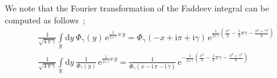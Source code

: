 \documentclass[12pt,reqno]{amsart}
\numberwithin{equation}{section}
\newcommand{\I}{\mathrm{i}}
\newcommand{\E}{\mathrm{e}}
\begin{document}
We note that
the Fourier transformation of the Faddeev integral can be computed as
follows~\cite{SLWoron00a,FaddKashVolk00a,BytskTesch02a,KharLebeSeme01a};
\begin{gather}
  \label{Fourier_transform_1}
  \frac{1}{\sqrt{4 \, \pi \, \gamma}}
  \int\limits_{\mathbb{R}}
  \mathrm{d} y \ \Phi_\gamma(y) \,
  \E^{\frac{1}{2 \, \I \, \gamma} \, x \, y}
  =
  \Phi_\gamma(-x + \I \pi + \I \gamma)
  \,
  \E^{
    \frac{1}{2 \, \I \, \gamma}
    \left(
      \frac{x^2}{2}
      - \frac{1}{2} \pi \gamma
      -
      \frac{\pi^2 + \gamma^2}{6}
    \right)
  } 
  \\[2mm]
% 
  \label{Fourier_transform_2}
  \frac{1}{\sqrt{4 \, \pi \, \gamma}}
  \int\limits_{\mathbb{R}} \mathrm{d} y \
  \frac{1}{\Phi_\gamma(y)} \,
  \E^{
    \frac{1}{2 \, \I \, \gamma} x \, y
  }
  =
  \frac{1}{
    \Phi_\gamma(x - \I\, \pi - \I\, \gamma)
  } \,
  \E^{
    -\frac{1}{2 \, \I \, \gamma}
    \left(
      \frac{x^2}{2}
      - \frac{1}{2} \pi \gamma
      - \frac{\pi^2+\gamma^2}{6}
    \right)
  } 
\end{gather}
\end{document}
